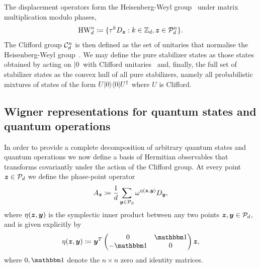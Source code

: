 \documentclass[pra,
aps,
twocolumn,
superscriptaddress,
groupedaddress,
nofootinbib,
reprint
]{revtex4-1}
\begin{document}
The displacement operators form the Heisenberg-Weyl group~\cite{Folland_1989, Bengtsson_2006} under matrix multiplication modulo phases,
\begin{equation}\label{eq:gp}
    {\rm{HW}}_d^n \coloneqq \{ \tau^k D_{\bmz}: k \in \mathbb{Z}_d, \bmz \in \cal{P}_d^n\}.
\end{equation}
The Clifford group $ \cal{C}_d^n $ is then defined as the set of unitaries that normalise the Heisenberg-Weyl group~\cite{Appleby_2005}. We may define the pure stabilizer states as those states obtained by acting on $|0\>$ with Clifford unitaries~\cite{cit:gross3} and, finally, the full set of stabilizer states as the convex hull of all pure stabilizers, namely all probabilistic mixtures of states of the form $U|0\>\<0|U^\dagger$ where $U$ is Clifford. 

\subsection{Wigner representations for quantum states and quantum operations}\label{sec:wigner}

In order to provide a complete decomposition of arbitrary quantum states and quantum operations we now define a basis of Hermitian observables that transforms covariantly under the action of the Clifford group. At every point $\bmz \in \P_d$ we define the phase-point operator
\begin{equation}\label{eq:ax}
	A_{\bmz} \coloneqq \frac{1}{d} \sum_{\bmy \in \cal{P}_d} \omega^{\eta(\bmz, \bmy)} D_{\bmy}, 
\end{equation}
where $\eta(\bmz, \y)$ is the symplectic inner product between any two points $\bmz,\y \in \P_d$, and is given explicitly by
\begin{equation}
	\eta(\bmz, \bmy) \coloneqq \bmy^T \begin{pmatrix}
		0  & \id \\ %
		-\id & 0 \\ %
	\end{pmatrix} \bmz,
\end{equation}
where $0, \id$ denote the $n\times n$ zero and identity matrices.
\end{document}
